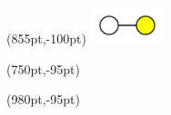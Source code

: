 \begin{textblock*}{\textwidth}(855pt,-100pt)
	\includegraphics[width=60pt]{img/subgraph/wy.png}
\end{textblock*}
\begin{textblock*}{\textwidth}(750pt,-95pt)
	\scriptsize
	\fontsize{18pt}{0pt} 
\end{textblock*}
\begin{textblock*}{\textwidth}(980pt,-95pt)
	\scriptsize
	\fontsize{18pt}{0pt} 
\end{textblock*}
